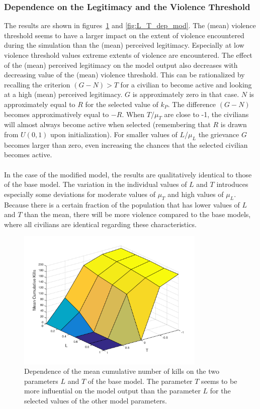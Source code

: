 \documentclass[11pt]{article}
\begin{document}
\subsubsection{Dependence on the Legitimacy and the Violence Threshold}
The results are shown in figures~\ref{fig:L_T_dep_base} and \ref{fig:L_T_dep_mod}. The (mean) violence threshold seems to have a larger impact on the extent of violence encountered during the simulation than the (mean) perceived legitimacy. Especially at low violence threshold values extreme extents of violence are encountered. The effect of the (mean) perceived legitimacy on the model output also decreases with decreasing value of the (mean) violence threshold. This can be rationalized by recalling the criterion $(G-N)>T$ for a civilian to become active and looking at a high (mean) perceived legitimacy. $G$ is approximately zero in that case. $N$ is approximately equal to $R$ for the selected value of $k_P$. The difference $(G-N)$ becomes approximatively equal to $-R$. When $T$/$\mu_T$ are close to -1, the civilians will almost always become active when selected (remembering that $R$ is drawn from $U(0,1)$ upon initialization). For smaller values of $L$/$\mu_L$ the grievance $G$ becomes larger than zero, even increasing the chances that the selected civilian becomes active.\\
\\
In the case of the modified model, the results are qualitatively identical to those of the base model. The variation in the individual values of $L$ and $T$ introduces especially some deviations for moderate values of $\mu_T$ and high values of $\mu_L$. Because there is a certain fraction of the population that has lower values of $L$ and $T$ than the mean, there will be more violence compared to the base models, where all civilians are identical regarding these characteristics.
\begin{figure}[!htbp]
	\centering
		\includegraphics[width=0.80\textwidth]{../../code/base_model/L_T_dep_mean.png}
	\caption{Dependence of the mean cumulative number of kills on the two parameters $L$ and $T$ of the base model. The parameter $T$ seems to be more influential on the model output than the parameter $L$ for the selected values of the other model parameters.}
	\label{fig:L_T_dep_base}
\end{figure}
\end{document}
